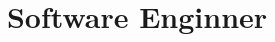 \documentclass[a4paper,10pt,color,final]{moderncv}
\title{Software Enginner}
\begin{document}
    \makecvtitle

    \begin{multicols}{2}
        \blindtext
        \blindtext
    \end{multicols}
\end{document}
